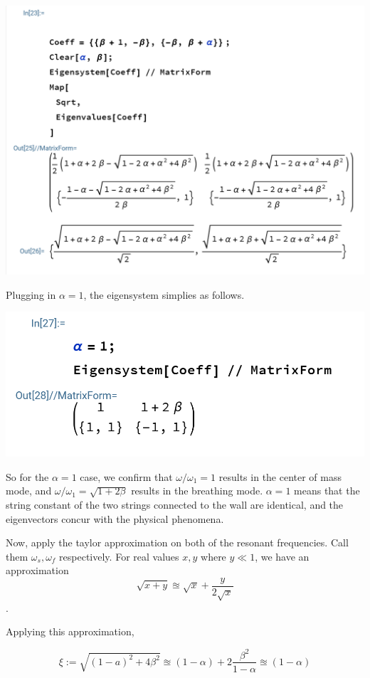 \documentclass{article}
\begin{document}
\begin{center}
\includegraphics[width = .9\linewidth]{Fig2.png}
\end{center}


Plugging in $\alpha = 1$, the eigensystem simplies as follows. 

\begin{center}
\includegraphics[width = .5\linewidth]{Fig3.png}
\end{center}

So for the $\alpha = 1$ case, we confirm that 
$\omega/\omega_1 = 1$ results in the center of 
mass mode, and $\omega/\omega_1 = \sqrt{1+2\beta}$ 
results in the breathing mode. $\alpha = 1$ means that 
the string constant of the two strings connected to 
the wall are identical, and the eigenvectors concur 
with the physical phenomena. 

Now, apply the taylor approximation on both of the resonant 
frequencies. Call them $\omega_s, \omega_f$ respectively. For 
real values $x, y$ where $y \ll 1$, we have an approximation 
\[
    \sqrt{x+y} \approxeq \sqrt{x} + \frac{y}{2\sqrt{x}}
\]. 


Applying this approximation, 

\[
    \xi := \sqrt{(1-a)^2 + 4\beta^2} 
    \approxeq (1-\alpha) + 2\frac{\beta^2}{1-\alpha}
    \approxeq (1-\alpha)
\]
\end{document}
